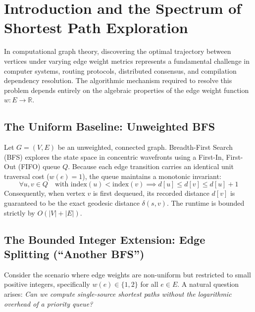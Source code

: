 \documentclass[10pt,journal,compsoc,onecolumn]{IEEEtran}
\begin{document}
\maketitle
\IEEEdisplaynontitleabstractindextext
\IEEEpeerreviewmaketitle

\section{Introduction and the Spectrum of Shortest Path Exploration}
\label{sec:introduction}

In computational graph theory, discovering the optimal trajectory between vertices under varying edge weight metrics represents a fundamental challenge in computer systems, routing protocols, distributed consensus, and compilation dependency resolution. The algorithmic mechanism required to resolve this problem depends entirely on the algebraic properties of the edge weight function $w: E \to \mathbb{R}$.

\subsection{The Uniform Baseline: Unweighted BFS}
Let $G = (V, E)$ be an unweighted, connected graph. Breadth-First Search (BFS) explores the state space in concentric wavefronts using a First-In, First-Out (FIFO) queue $Q$. Because each edge transition carries an identical unit traversal cost ($w(e) = 1$), the queue maintains a monotonic invariant:
\begin{equation}
\forall u, v \in Q \quad \text{with index}(u) < \text{index}(v) \implies d[u] \le d[v] \le d[u] + 1
\end{equation}
Consequently, when vertex $v$ is first dequeued, its recorded distance $d[v]$ is guaranteed to be the exact geodesic distance $\delta(s, v)$. The runtime is bounded strictly by $O(|V| + |E|)$.

\subsection{The Bounded Integer Extension: Edge Splitting (``Another BFS'')}
Consider the scenario where edge weights are non-uniform but restricted to small positive integers, specifically $w(e) \in \{1, 2\}$ for all $e \in E$. A natural question arises: \emph{Can we compute single-source shortest paths without the logarithmic overhead of a priority queue?}
\end{document}
